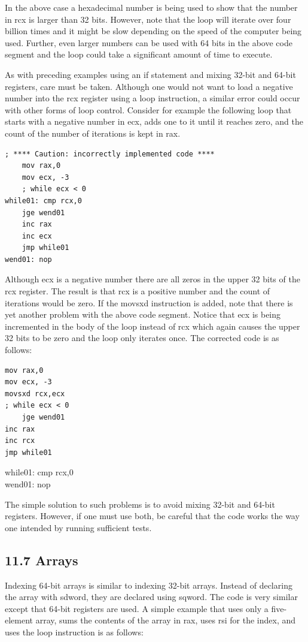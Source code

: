 \documentclass[10pt]{book}
\begin{document}
\begin{center}
\begin{center}
\begin{center}
\begin{center}
In the above case a hexadecimal number is being used to show that the number in rcx is larger than 32 bits. However, note that the loop will iterate over four billion times and it might be slow depending on the speed of the computer being used. Further, even larger numbers can be used with 64 bits in the above code segment and the loop could take a significant amount of time to execute.

As with preceding examples using an if statement and mixing 32-bit and 64-bit registers, care must be taken. Although one would not want to load a negative number into the rcx register using a loop instruction, a similar error could occur with other forms of loop control. Consider for example the following loop that starts with a negative number in ecx, adds one to it until it reaches zero, and the count of the number of iterations is kept in rax.


\begin{verbatim}
; **** Caution: incorrectly implemented code ****
    mov rax,0
    mov ecx, -3
    ; while ecx < 0
while01: cmp rcx,0
    jge wend01
    inc rax
    inc ecx
    jmp while01
wend01: nop
\end{verbatim}

Although ecx is a negative number there are all zeros in the upper 32 bits of the rcx register. The result is that rcx is a positive number and the count of iterations would be zero. If the movsxd instruction is added, note that there is yet another problem with the above code segment. Notice that ecx is being incremented in the body of the loop instead of rcx which again causes the upper 32 bits to be zero and the loop only iterates once. The corrected code is as follows:

\begin{verbatim}
mov rax,0
mov ecx, -3
movsxd rcx,ecx
; while ecx < 0
    jge wend01
inc rax
inc rcx
jmp while01
\end{verbatim}

while01: cmp rcx,0\\
wend01: nop

The simple solution to such problems is to avoid mixing 32-bit and 64-bit registers. However, if one must use both, be careful that the code works the way one intended by running sufficient tests.

\subsection*{11.7 Arrays}
Indexing 64-bit arrays is similar to indexing 32-bit arrays. Instead of declaring the array with sdword, they are declared using sqword. The code is very similar except that 64-bit registers are used. A simple example that uses only a five-element array, sums the contents of the array in rax, uses rsi for the index, and uses the loop instruction is as follows:



\end{center}
\end{center}
\end{center}
\end{center}
\end{document}
